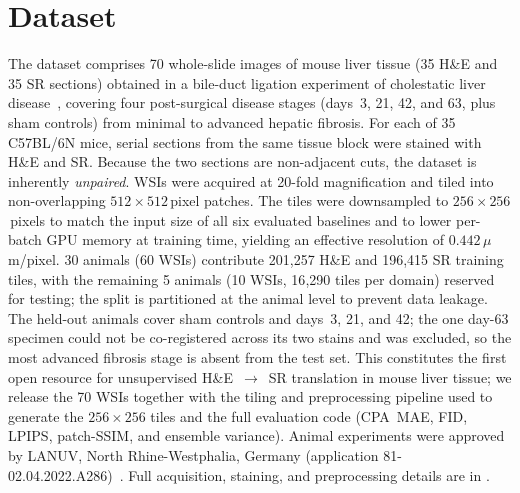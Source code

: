 \section{Dataset}
\label{sec:dataset}

The dataset comprises 70 whole-slide images of mouse liver tissue
(35 H\&E and 35 SR sections) obtained in a bile-duct ligation experiment of cholestatic
liver disease~\cite{ghallab2025asbt}, covering four post-surgical disease stages
(days~3, 21, 42, and 63, plus sham controls) from minimal to advanced hepatic fibrosis.
For each of 35 C57BL/6N mice, serial sections from the same tissue block were stained
with H\&E and SR. Because the two sections are non-adjacent cuts, the dataset is
inherently \emph{unpaired}.
WSIs were acquired at 20-fold magnification and tiled into non-overlapping
$512{\times}512$\,pixel patches. The tiles were downsampled to $256{\times}256$\,pixels
to match the input size of all six evaluated baselines and to lower per-batch GPU
memory at training time, yielding an effective resolution of $0.442\,\mu$m/pixel.
30 animals (60 WSIs) contribute 201{,}257 H\&E and 196{,}415 SR training tiles, with
the remaining 5 animals (10 WSIs, 16{,}290 tiles per domain) reserved for testing;
the split is partitioned at the animal level to prevent data leakage.
The held-out animals cover sham controls and days~3, 21, and 42; the one day-63
specimen could not be co-registered across its two stains and was excluded, so the
most advanced fibrosis stage is absent from the test set.
This constitutes the first open resource for unsupervised H\&E~$\to$~SR translation in
mouse liver tissue; we release the 70 WSIs together with the tiling
and preprocessing pipeline used to generate the $256{\times}256$ tiles and the full
evaluation code (CPA~MAE, FID, LPIPS, patch-SSIM, and ensemble variance).
Animal experiments were approved by LANUV, North Rhine-Westphalia, Germany
(application 81-02.04.2022.A286)~\cite{ghallab2025asbt}. Full
acquisition, staining, and preprocessing details are in .
%
%
%
